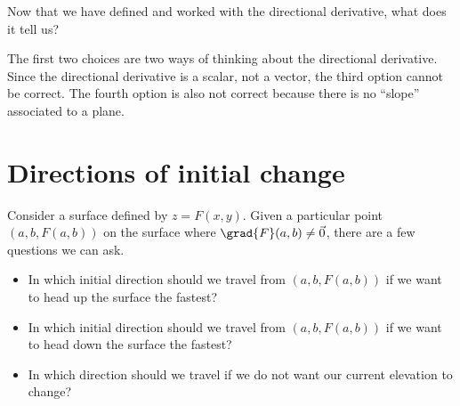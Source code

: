 \documentclass{ximera}
\begin{document}
\begin{question}
Now that we have defined and worked with the directional derivative,
what does it tell us?
\begin{selectAll}
\end{selectAll}
\begin{feedback}
  The first two choices are two ways of thinking about the directional derivative.  Since the directional derivative is a scalar, not a vector, the third option cannot be correct.  The fourth option is also not correct because there is no ``slope'' associated to a plane.
\end{feedback}
\end{question}

%
%

\section{Directions of initial change}

Consider a surface defined by $z = F(x,y)$.  Given a particular point
$(a,b,F(a,b))$ on the surface where $\grad{F}(a,b) \neq \vec{0}$,
there are a few questions we can ask.

\begin{itemize}
\item In which initial direction should we travel from $(a,b,F(a,b))$
  if we want to head up the surface the fastest?
\item In which initial direction should we travel from $(a,b,F(a,b))$
  if we want to head down the surface the fastest?
\item In which direction should we travel if we do not want our
  current elevation to change?
\end{itemize}
\end{document}
